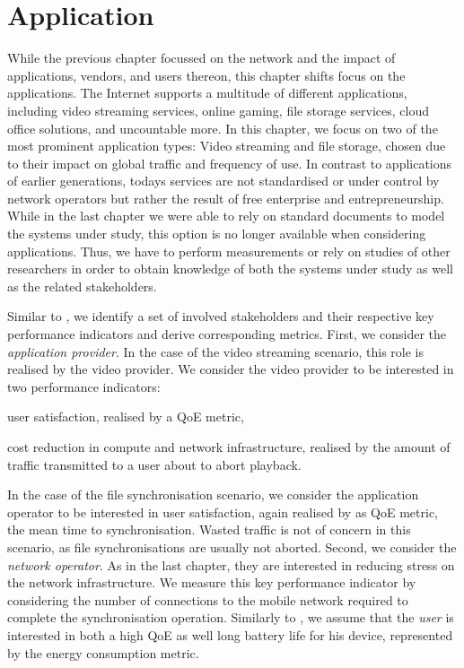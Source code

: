 \chapter{Application}\label{chap:application}

\newcommand{\download}{Download\xspace}
\newcommand{\live}{Live\xspace}
\newcommand{\serviceprovisioning}{Provisioning\xspace}
\newcommand{\streaming}{Streaming\xspace}

While the previous chapter focussed on the network and the impact of applications, vendors, and users thereon, this chapter shifts focus on the applications.
The Internet supports a multitude of different applications, including video streaming services, online gaming, file storage services, cloud office solutions, and uncountable more.
In this chapter, we focus on two of the most prominent application types: Video streaming and file storage, chosen due to their impact on global traffic and frequency of use.
In contrast to applications of earlier generations, todays services are not standardised or under control by network operators but rather the result of free enterprise and entrepreneurship.
While in the last chapter we were able to rely on standard documents to model the systems under study, this option is no longer available when considering applications.
Thus, we have to perform measurements or rely on studies of other researchers in order to obtain knowledge of both the systems under study as well as the related stakeholders.

Similar to , we identify a set of involved stakeholders and their respective key performance indicators and derive corresponding metrics.
First, we consider the \emph{application provider}. 
In the case of the video streaming scenario, this role is realised by the video provider.
We consider the video provider to be interested in two performance indicators: 
\begin{enumerate*}
\item user satisfaction, realised by a \gls{QoE} metric,
\item cost reduction in compute and network infrastructure, realised by the amount of traffic transmitted to a user about to abort playback.
\end{enumerate*}
In the case of the file synchronisation scenario, we consider the application operator to be interested in user satisfaction, again realised by as \gls{QoE} metric, the mean time to synchronisation.
Wasted traffic is not of concern in this scenario, as file synchronisations are usually not aborted.
Second, we consider the \emph{network operator}.
As in the last chapter, they are interested in reducing stress on the network infrastructure.
We measure this key performance indicator by considering the number of connections to the mobile network required to complete the synchronisation operation.
Similarly to , we assume that the \emph{user} is interested in both a high \gls{QoE} as well long battery life for his device, represented by the energy consumption metric. 

